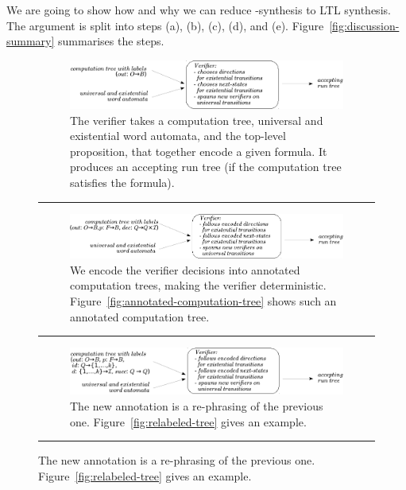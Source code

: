 We are going to show how and why we can reduce \CTLstar-synthesis to LTL synthesis.
The argument is split into steps (a), (b), (c), (d), and (e).
Figure~\ref{fig:discussion-summary} summarises the steps.
\begin{figure}[tbp]
%
\begin{subfigure}{\linewidth}\center
\includegraphics[width=\textwidth]{figures/stepA.pdf}
\caption{The verifier takes a computation tree, universal and existential word automata, and the top-level proposition, that together encode a given \CTLstar formula. It produces an accepting run tree (if the computation tree satisfies the formula).}
\label{fig:stepA}
\end{subfigure}
\vspace{0.1cm}
\hrule
\vspace{0.2cm}
%
\begin{subfigure}{\linewidth}\center
\includegraphics[width=\textwidth]{figures/stepB.pdf}
\caption{We encode the verifier decisions into annotated computation trees,
  making the verifier deterministic.
  Figure~\ref{fig:annotated-computation-tree} shows such an annotated computation tree.}
\label{fig:stepB}
\end{subfigure}
\vspace{0.1cm}
\hrule
\vspace{0.2cm}
%
\begin{subfigure}{\linewidth}\center
\includegraphics[width=\textwidth]{figures/stepC.pdf}
\caption{The new annotation is a re-phrasing of the previous one.
Figure~\ref{fig:relabeled-tree} gives an example.}
\label{fig:stepC}
\end{subfigure}
\vspace{0.1cm}
\hrule
\vspace{0.2cm}

\end{figure}

